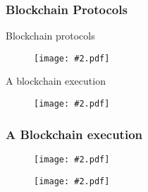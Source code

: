 \documentclass{beamer}
\newcommand{\insfig}[2][1]{
	\begin{figure}
		\texttt{[image: \#2.pdf]}
	\end{figure}
}
\newcommand{\insblk}[2]{
	\begin{block}{#1}
		\insfig{#2}
	\end{block}
}
\begin{document}
\begin{spacing}{1.2}
\begin{frame}
	\frametitle{Blockchain Protocols}
	\insblk{Blockchain protocols}{BP1}
	\insblk{A blockchain execution}{BP2}
\end{frame}

\begin{frame}
	\frametitle{A Blockchain execution}
	\insfig{BP30}
	\vspace{-20pt}
	\insfig{BP33}
\end{frame}

%


\end{spacing}
\end{document}
